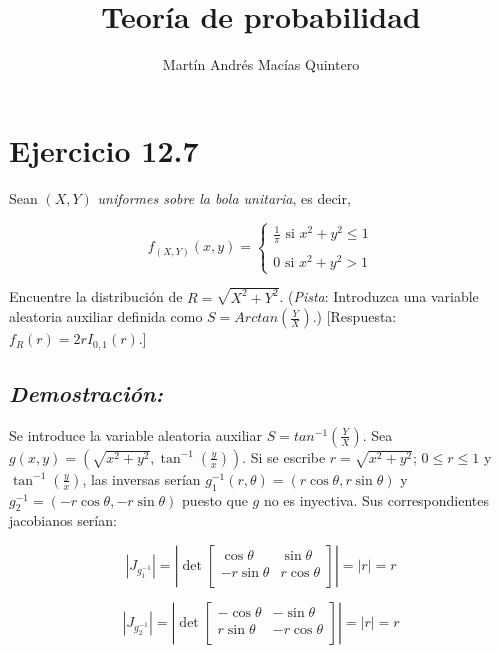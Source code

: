 \documentclass[]{article}
\title{Teoría de probabilidad}
\author{Martín Andrés Macías Quintero}
\date{}
\begin{document}
\maketitle

\section{Ejercicio 12.7}\label{ejercicio-12.7}

Sean \((X, Y)\) \emph{uniformes sobre la bola unitaria}, es decir,

\[
f_{(X, Y)} (x,y) =
\begin{cases}
\frac{1}{\pi}\text{ si } x^2+y^2\leq 1\\
\\
0 \text{ si } x^2+y^2 > 1
\end{cases}
\]

Encuentre la distribución de \(R=\sqrt{X^2+Y^2}\). (\emph{Pista}:
Introduzca una variable aleatoria auxiliar definida como
\(S=Arctan\left(\frac{Y}{X}\right)\).) {[}Respuesta:
\(f_R(r)=2rI_{0,1}(r)\).{]}

\subsection{\texorpdfstring{\emph{Demostración:}}{Demostración:}}\label{demostracion}

Se introduce la variable aleatoria auxiliar
\(S=tan^{-1} \left(\frac{Y}{X}\right)\). Sea
\(g(x,y)=\left( \sqrt{x^2+y^2}, \tan^{-1} \left(\frac{y}{x}\right) \right)\).
Si se escribe \(r=\sqrt{x^2+y^2}\); \(0\leq r\leq 1\) y
\(\tan^{-1} \left(\frac{y}{x}\right)\), las inversas serían
\(g_1^{-1}(r,\theta)=(r\cos\theta, r\sin\theta)\) y
\(g_2^{-1}=(-r\cos\theta, -r\sin\theta)\) puesto que \(g\) no es
inyectiva. Sus correspondientes jacobianos serían:

\begin{equation}
\left| J_{g_1^{-1}}  \right|
=\left| \det 
\begin{bmatrix} 
\cos\theta &  \sin\theta \\
-r\sin\theta &  r\cos\theta \\
\end{bmatrix}  \right|
=|r|=r
\end{equation}

\begin{equation}
\left| J_{g_2^{-1}}  \right|
=\left| \det 
\begin{bmatrix} 
-\cos\theta &  -\sin\theta \\
r\sin\theta &  -r\cos\theta \\
\end{bmatrix}  \right|
=|r|=r
\end{equation}
\end{document}
